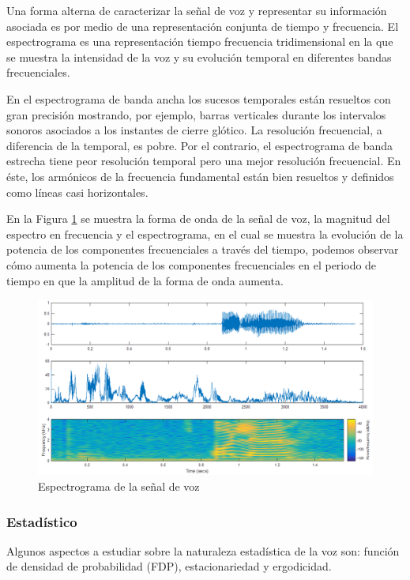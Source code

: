 Una forma alterna de caracterizar la señal de voz y representar su información asociada es por medio de una representación conjunta de tiempo y frecuencia. El espectrograma es una representación tiempo frecuencia tridimensional en la que se muestra la intensidad de la voz y su evolución temporal en diferentes bandas frecuenciales.

En el espectrograma de banda ancha los sucesos temporales están resueltos con gran precisión mostrando, por ejemplo, barras verticales durante los intervalos sonoros asociados a los instantes de cierre glótico. La resolución frecuencial, a diferencia de la temporal, es pobre. Por el contrario, el espectrograma de banda estrecha tiene peor resolución temporal pero una mejor resolución frecuencial. En éste, los armónicos de la frecuencia fundamental están bien resueltos y definidos como líneas casi horizontales.

En la Figura \ref{fig:spectrogram} se muestra la forma de onda de la señal de voz, la magnitud del espectro en frecuencia y el espectrograma, en el cual se muestra la evolución de la potencia de los componentes frecuenciales a través del tiempo, podemos observar cómo aumenta la potencia de los componentes frecuenciales en el periodo de tiempo en que la amplitud de la forma de onda aumenta.

\begin{figure}[H]
	\centering
	\includegraphics[width=1\linewidth]{figures/spectrogram}
	\caption{Espectrograma de la señal de voz}
	\label{fig:spectrogram}
\end{figure}

\subsubsection{Estadístico}

Algunos aspectos a estudiar sobre la naturaleza estadística de la voz son: función de densidad de probabilidad (FDP), estacionariedad y ergodicidad.

